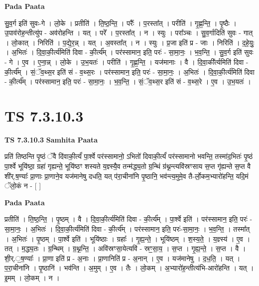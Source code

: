 \documentclass[17pt]{extarticle}
\begin{document}
\textbf{Pada Paata} \newline

सु॒व॒र्ग इति॑ सुवः-गे । लो॒के । प्रतीति॑ । ति॒ष्ठ॒न्ति॒ । परैः᳚ । प॒रस्ता᳚त् । परीति॑ । गृ॒ह्ण॒न्ति॒ । पृ॒ष्ठैः । उ॒पाव॑रोह॒न्तीत्यु॑प - अव॑रोहन्ति । यत् । परे᳚ । प॒रस्ता᳚त् । न । स्युः । परा᳚ञ्चः । सु॒व॒र्गादिति॑ सुवः - गात् । लो॒कात् । निरिति॑ । प॒द्ये॒र॒न्न् । यत् । अ॒वस्ता᳚त् । न । स्युः । प्र॒जा इति॑ प्र - जाः । निरिति॑ । द॒हे॒युः॒ । अ॒भितः॑ । दि॒वा॒की॒र्त्य॑मिति॑ दिवा - की॒र्त्य᳚म् । पर॑स्सामान॒ इति॒ परः॑ - सा॒मा॒नः॒ । भ॒व॒न्ति॒ । सु॒व॒र्ग इति॑ सुवः - गे । ए॒व । ए॒ना॒न्न् । लो॒के । उ॒भ॒यतः॑ । परीति॑ । गृ॒ह्ण॒न्ति॒ । यज॑मानाः । वै । दि॒वा॒की᳚र्त्यमिति॑ दिवा - की॒र्त्य᳚म् । सं॒ॅव॒थ्स॒र इति॑ सं - व॒थ्स॒रः । पर॑स्सामान॒ इति॒ परः॑ - सा॒मा॒नः॒ । अ॒भितः॑ । दि॒वा॒की॒र्त्य॑मिति॑ दिवा - की॒र्त्य᳚म् । पर॑स्सामान॒ इति॒ परः॑ - सा॒मा॒नः॒ । भ॒व॒न्ति॒ । सं॒ॅव॒थ्स॒र इति॑ सं - व॒थ्स॒रे । ए॒व । उ॒भ॒यतः॑ ।  \newline





\section{ TS 7.3.10.3 }

\textbf{TS 7.3.10.3 } \newline
\textbf{Samhita Paata} \newline

प्रति॑ तिष्ठन्ति पृ॒ष्ठं ॅवै दि॑वाकी॒र्त्यं॑ पा॒र्श्वे पर॑स्सामानो॒ ऽभितो॑ दिवाकी॒र्त्यं॑ पर॑स्सामानो भवन्ति॒ तस्मा॑द॒भितः॑ पृ॒ष्ठं पा॒र्श्वे भूयि॑ष्ठा॒ ग्रहा॑ गृह्यन्ते॒ भूयि॑ष्ठꣳ शस्यते य॒ज्ञ्स्यै॒व तन्म॑द्ध्य॒तो ग्र॒न्थिं ग्र॑थ्न॒न्त्यवि॑स्रꣳसाय स॒प्त गृ॑ह्यन्ते स॒प्त वै शी॑र्.ष॒ण्याः᳚ प्रा॒णाः प्रा॒णाने॒व यज॑मानेषु दधति॒ यत् प॑रा॒चीना॑नि पृ॒ष्ठानि॒ भव॑न्त्य॒मुमे॒व तै-र्लो॒कम॒भ्यारो॑हन्ति॒ यदि॒मं ॅलो॒कं न - [  ] \newline

\textbf{Pada Paata} \newline

प्रतीति॑ । ति॒ष्ठ॒न्ति॒ । पृ॒ष्ठम् । वै । दि॒वा॒की॒र्त्य॑मिति॑ दिवा - की॒र्त्य᳚म् । पा॒र्श्वे इति॑ । पर॑स्सामान॒ इति॒ परः॑ - सा॒मा॒नः॒ । अ॒भितः॑ । दि॒वा॒की॒र्त्य॑मिति॑ दिवा - की॒र्त्य᳚म् । पर॑स्सामान॒ इति॒ परः॑-सा॒मा॒नः॒ । भ॒व॒न्ति॒ । तस्मा᳚त् । अ॒भितः॑ । पृ॒ष्ठम् । पा॒र्श्वे इति॑ । भूयि॑ष्ठाः । ग्रहाः᳚ । गृ॒ह्य॒न्ते॒ । भूयि॑ष्ठम् । श॒स्य॒ते॒ । य॒ज्ञ्स्य॑ । ए॒व । तत् । म॒द्ध्य॒तः । ग्र॒न्थिम् । ग्र॒थ्न॒न्ति॒ । अवि॑स्रꣳसा॒येत्यवि॑ - स्रꣳ॒॒सा॒य॒ । स॒प्त । गृ॒ह्य॒न्ते॒ । स॒प्त । वै । शी॒र्.॒ष॒ण्याः᳚ । प्रा॒णा इति॑ प्र - अ॒नाः । प्रा॒णानिति॑ प्र - अ॒नान् । ए॒व । यज॑मानेषु । द॒ध॒ति॒ । यत् । प॒रा॒चीना॑नि । पृ॒ष्ठानि॑ । भव॑न्ति । अ॒मुम् । ए॒व । तैः । लो॒कम् । अ॒भ्यारो॑ह॒न्तीत्य॑भि-आरो॑हन्ति । यत् । इ॒मम् । लो॒कम् । न ।  \newline
\end{document}
